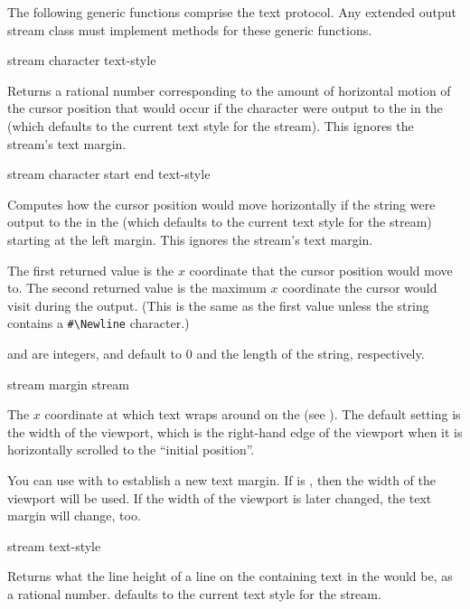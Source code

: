 The following generic functions comprise the text protocol.  Any extended output
stream class must implement methods for these generic functions.

 {stream character \key text-style}

Returns a rational number corresponding to the amount of horizontal motion of
the cursor position that would occur if the character  were
output to the   in the   (which defaults to the current text style for the
stream).  This ignores the stream's text margin.

 {stream character \key start end text-style}

Computes how the cursor position would move horizontally if the string
 were output to the   in
the   (which defaults to the current text style
for the stream) starting at the left margin.  This ignores the stream's text
margin.

The first returned value is the $x$ coordinate that the cursor position would
move to.  The second returned value is the maximum $x$ coordinate the cursor
would visit during the output. (This is the same as the first value unless the
string contains a \verb+#\Newline+ character.)

 and  are integers, and default to 0 and the length of the
string, respectively.


 {stream}
 {margin stream}

The $x$ coordinate at which text wraps around on the   (see ).  The default setting
is the width of the viewport, which is the right-hand edge of the viewport when
it is horizontally scrolled to the ``initial position''.

You can use  with  to establish a new text
margin.  If  is , then the width of the viewport will be
used.  If the width of the viewport is later changed, the text margin will
change, too.


 {stream \key text-style}

Returns what the line height of a line on the 
 containing text in the   would be,
as a rational number.   defaults to the current text style for
the stream.


